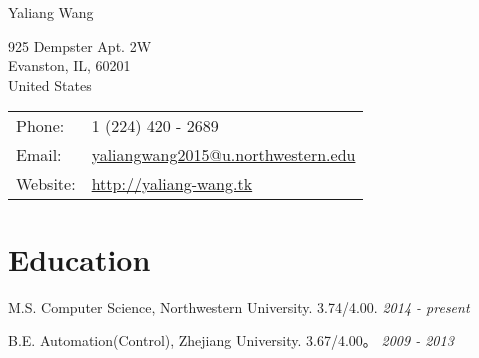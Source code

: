 \documentclass[letterpaper,8pt]{extarticle}
\newlength{\wideitemsep}
\let\olditem\item
\renewcommand{\item}{\setlength{\itemsep}{\wideitemsep}\olditem}
\def\name{Yaliang Wang}
\renewenvironment{itemize}{
  \begin{list}{}{
    \setlength{\leftmargin}{1.5em}
  }
}{
  \end{list}
}
\begin{document}
{\huge \name}


\vspace{0.2in}

\begin{minipage}{0.45\linewidth}
  925 Dempster Apt. 2W \\
  Evanston, IL, 60201 \\
  United States 
  
\end{minipage}
\begin{minipage}{0.45\linewidth}
  \begin{tabular}{ll}
    Phone: & 1 (224) 420 - 2689 \\
    Email: & \href{mailto:yaliangwang2015@u.northwestern.edu}{yaliangwang2015@u.northwestern.edu} \\
    Website: & \href{http://yaliang-wang.tk}{http://yaliang-wang.tk} \\
  \end{tabular}
\end{minipage}


%

%

\section*{Education \noindent\hrulefill}

\begin{itemize}
  \item[$\circ$] M.S. Computer Science, Northwestern University. 3.74/4.00. \hfill {\it 2014 - present}
  \item[$\circ$] B.E. Automation(Control), Zhejiang University. 3.67/4.00。 \hfill {\it 2009 - 2013}
\end{itemize}
\end{document}
